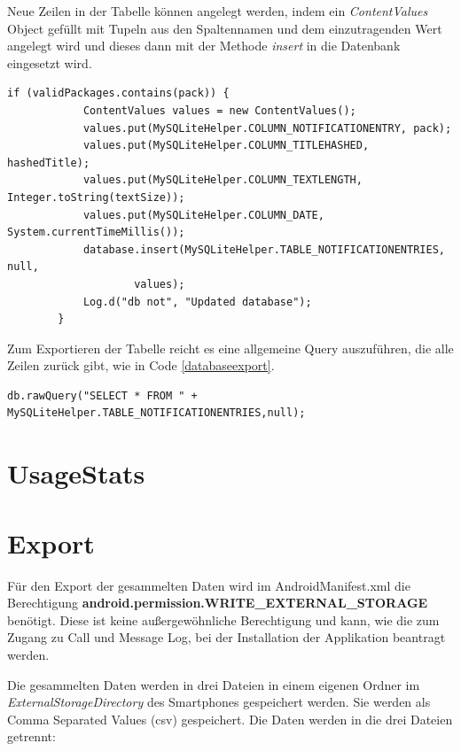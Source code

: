 Neue Zeilen in der Tabelle können angelegt werden, indem ein \emph{ContentValues} Object gefüllt 
mit Tupeln aus den Spaltennamen und dem einzutragenden Wert angelegt wird und dieses dann mit der Methode \emph{insert} in die Datenbank eingesetzt wird.

\begin{lstlisting}[frame=single, caption = Einfügen in die Datenbank, label=databaseinsert] 
if (validPackages.contains(pack)) {
            ContentValues values = new ContentValues();
            values.put(MySQLiteHelper.COLUMN_NOTIFICATIONENTRY, pack);
            values.put(MySQLiteHelper.COLUMN_TITLEHASHED, hashedTitle);
            values.put(MySQLiteHelper.COLUMN_TEXTLENGTH, Integer.toString(textSize));
            values.put(MySQLiteHelper.COLUMN_DATE, System.currentTimeMillis());
            database.insert(MySQLiteHelper.TABLE_NOTIFICATIONENTRIES, null,
                    values);
            Log.d("db not", "Updated database");
        }
\end{lstlisting}

Zum Exportieren der Tabelle reicht es eine allgemeine Query auszuführen, die alle Zeilen zurück gibt, wie in Code 
\ref{databaseexport}.

\begin{lstlisting}[frame=single, caption = Einfügen in die Datenbank, label=databaseexport] 
  db.rawQuery("SELECT * FROM " + MySQLiteHelper.TABLE_NOTIFICATIONENTRIES,null); 
\end{lstlisting}

\section{UsageStats}

\section{Export}

Für den Export der gesammelten Daten wird im AndroidManifest.xml die Berechtigung \textbf{android.permission.WRITE\_EXTERNAL\_STORAGE}
benötigt. 
Diese ist keine außergewöhnliche Berechtigung und kann, wie die zum Zugang zu Call und Message Log, bei der Installation der Applikation beantragt werden.
\par
Die gesammelten Daten werden in drei Dateien in einem eigenen Ordner im \emph{ExternalStorageDirectory} des Smartphones gespeichert werden.
Sie werden als Comma Separated Values (csv) gespeichert.
Die Daten werden in die drei Dateien getrennt:

